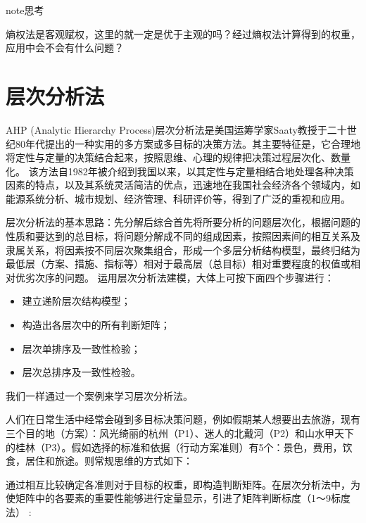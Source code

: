 \documentclass[letterpaper,10pt,english]{sphinxmanual}
\begin{document}
\begin{sphinxadmonition}{note}{思考}

熵权法是客观赋权，这里的就一定是优于主观的吗？经过熵权法计算得到的权重，应用中会不会有什么问题？
\end{sphinxadmonition}


\section{层次分析法}
\label{\detokenize{docs/evaluation_model:id19}}
AHP (Analytic Hierarchy Process)层次分析法是美国运筹学家Saaty教授于二十世纪80年代提出的一种实用的多方案或多目标的决策方法。其主要特征是，它合理地将定性与定量的决策结合起来，按照思维、心理的规律把决策过程层次化、数量化。 该方法自1982年被介绍到我国以来，以其定性与定量相结合地处理各种决策因素的特点，以及其系统灵活简洁的优点，迅速地在我国社会经济各个领域内，如能源系统分析、城市规划、经济管理、科研评价等，得到了广泛的重视和应用。

层次分析法的基本思路：先分解后综合首先将所要分析的问题层次化，根据问题的性质和要达到的总目标，将问题分解成不同的组成因素，按照因素间的相互关系及隶属关系，将因素按不同层次聚集组合，形成一个多层分析结构模型，最终归结为最低层（方案、措施、指标等）相对于最高层（总目标）相对重要程度的权值或相对优劣次序的问题。 运用层次分析法建模，大体上可按下面四个步骤进行：
\begin{itemize}
\item {} 
建立递阶层次结构模型；

\item {} 
构造出各层次中的所有判断矩阵；

\item {} 
层次单排序及一致性检验；

\item {} 
层次总排序及一致性检验。

\end{itemize}

我们一样通过一个案例来学习层次分析法。

人们在日常生活中经常会碰到多目标决策问题，例如假期某人想要出去旅游，现有三个目的地（方案）：风光绮丽的杭州（P1）、迷人的北戴河（P2）和山水甲天下的桂林（P3）。假如选择的标准和依据（行动方案准则）有5个：景色，费用，饮食，居住和旅途。则常规思维的方式如下：


通过相互比较确定各准则对于目标的权重，即构造判断矩阵。在层次分析法中，为使矩阵中的各要素的重要性能够进行定量显示，引进了矩阵判断标度（1～9标度法） :
\end{document}
